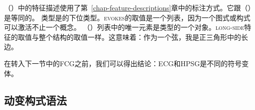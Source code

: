 （）中的特征描述使用了第~\ref{chap-feature-descriptions}章中的标注方式。它跟（）是等同的。
\ea
{} 
\z
类型是的下位类型。\textsc{evokes}的取值是一个列表，因为一个图式或构式可以激活不止一个概念。 （）列表中的唯一元素是类型的一个对象。\textsc{long-side}特征的取值与整个结构的取值一样。这意味着：作为一个弦，我是正三角形中的长边。

在转入下一节中的FCG之前，我们可以得出结论：ECG和HPSG是不同的符号变体。

\subsection{动变构式语法}
\label{sec-fcg}

